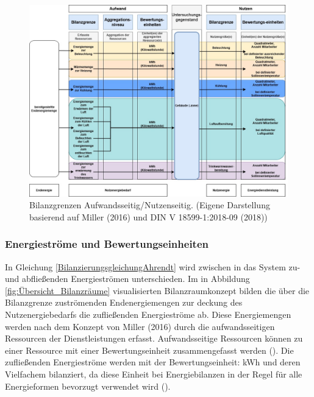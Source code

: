 \begin{figure}[H]
    \centering
    \includegraphics[width=1\textwidth]{../../Ressourcen/Abbildungen/Nutzengröße_Bewertungseinheit.jpg}
    \caption{Bilanzgrenzen Aufwandsseitig/Nutzenseitig. (Eigene Darstellung basierend auf Miller (2016) und DIN V 18599-1:2018-09 (2018))}
    \label{fig:Übersicht_Bilanzräume}
\end{figure}


\subsubsection{Energieströme und Bewertungseinheiten}

In Gleichung \eqref{BilanzierungsgleichungAhrendt} wird zwischen in das System zu- und abfließenden Energieströmen unterschieden.
Im in Abbildung \eqref{fig:Übersicht_Bilanzräume} visualisierten Bilanzraumkonzept bilden die über die Bilanzgrenze zuströmenden Endenergiemengen 
zur deckung des Nutzenergiebedarfs die zufließenden Energieströme ab. 
Diese Energiemengen werden nach dem Konzept von Miller (2016) durch die aufwandsseitigen Ressourcen der Dienstleistungen erfasst.
Aufwandsseitige Ressourcen können zu einer Ressource mit einer Bewertungseinheit zusammengefasst werden (\cite[S. 112]{Miller.2016}).  
Die zufließenden Energieströme werden mit der Bewertungseinheit: kWh und deren Vielfachem bilanziert, da diese Einheit bei Energiebilanzen in der Regel 
für alle Energieformen bevorzugt verwendet wird (\cite[S. 65]{Konstantin.2023}).


